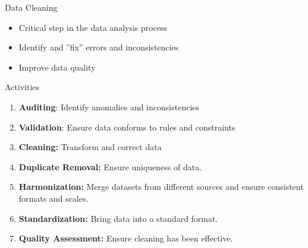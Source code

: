 \documentclass[ignorenonframetext,xcolor=x11names]{beamer}
\begin{document}
\begin{frame}{Data Cleaning}
\begin{itemize}
  \item Critical step in the data analysis process
  \item Identify and ''fix'' errors and inconsistencies
  \item Improve data quality
\end{itemize}

\begin{block}{Activities}
\begin{enumerate}
    \item \textbf{Auditing}: Identify anomalies and inconsistencies

    \item \textbf{Validation}: Ensure data conforms to rules and constraints

    \item \textbf{Cleaning:} Transform and correct data

    \item \textbf{Duplicate Removal:} Ensure uniqueness of data.

    \item \textbf{Harmonization:} Merge datasets from different sources and ensure consistent formats and scales.

    \item \textbf{Standardization:} Bring data into a standard format.

    \item \textbf{Quality Assessment:} Ensure cleaning has been effective.
\end{enumerate}
\end{block}
\end{frame}
\end{document}
